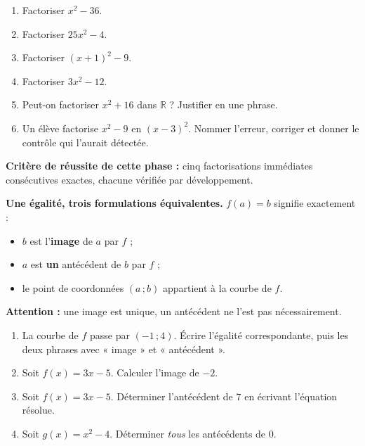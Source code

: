 \documentclass[10pt,a4paper]{article}
\begin{document}
\begin{enumerate}
\needspace{18mm}
\item Factoriser $x^2 - 36$.
\needspace{18mm}
\item Factoriser $25x^2 - 4$.
\needspace{18mm}
\item Factoriser $(x + 1)^2 - 9$.
\needspace{18mm}
\item Factoriser $3x^2 - 12$.
\needspace{18mm}
\item Peut-on factoriser $x^2 + 16$ dans $\mathbb{R}$ ? Justifier en une phrase.
\needspace{18mm}
\item Un élève factorise $x^2 - 9$ en $(x - 3)^2$. Nommer l'erreur, corriger et donner le contrôle qui l'aurait détectée.
\end{enumerate}
\begin{successbox}\textbf{Critère de réussite de cette phase :} cinq factorisations immédiates consécutives exactes, chacune vérifiée par développement.\end{successbox}
\certline
\needspace{62mm}\par\vspace{3mm}
\begin{methodbox}
\textbf{Une égalité, trois formulations équivalentes.} $f(a) = b$ signifie exactement :
\begin{itemize}
\item $b$ est l'\textbf{image} de $a$ par $f$ ;
\item $a$ est \textbf{un} antécédent de $b$ par $f$ ;
\item le point de coordonnées $(a\,;b)$ appartient à la courbe de $f$.
\end{itemize}
\textbf{Attention :} une image est unique, un antécédent ne l'est pas nécessairement.
\end{methodbox}
\begin{enumerate}
\needspace{18mm}
\item La courbe de $f$ passe par $(-1\,;4)$. Écrire l'égalité correspondante, puis les deux phrases avec « image » et « antécédent ».
\needspace{18mm}
\item Soit $f(x) = 3x - 5$. Calculer l'image de $-2$.
\needspace{18mm}
\item Soit $f(x) = 3x - 5$. Déterminer l'antécédent de $7$ en écrivant l'équation résolue.
\needspace{18mm}
\item Soit $g(x) = x^2 - 4$. Déterminer \emph{tous} les antécédents de $0$.
\end{enumerate}
\end{document}
